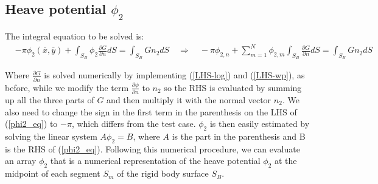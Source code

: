 \documentclass[a4paper,10pt]{article}
\newcommand{\dd}{\partial}
\newcommand{\xbar}{\overline{x}}
\newcommand{\ybar}{\overline{y}}
\begin{document}
\subsection{Heave potential $\phi_2$}
The integral equation to be solved is:
\begin{align} \label{phi2_eq}
& -\pi \phi_2(\xbar, \ybar) + \int_{S_B} \phi_2 \frac{\dd G}{\dd n} dS = \int_{S_B} G n_2 dS
\quad \Rightarrow \quad -\pi \phi_{2,n} + \sum_{m=1}^N \phi_{2,m}\int_{S_B} \frac{\dd G}{\dd n} dS = \int_{S_B} G n_2 dS
\end{align} 

Where $\frac{\dd G}{\dd n}$ is solved numerically by implementing (\ref{LHS-log}) and (\ref{LHS-wp}), as before, while we modify the term $\frac{\dd \phi}{\dd n}$ to $n_2$ so the RHS is evaluated by summing up all the three parts of $G$ and then multiply it with the normal vector $n_2$. We also need to change the sign in the first term in the parenthesis on the LHS of (\ref{phi2_eq}) to $-\pi$, which differs from the test case. $\phi_2$ is then easily estimated by solving the linear system $A \phi_2 = B$, where $A$ is the part in the parenthesis and B is the RHS of (\ref{phi2_eq}). Following this numerical procedure, we can evaluate an array $\phi_2$ that is a numerical representation of the heave potential $\phi_2$ at the midpoint of each segment $S_m$ of the rigid body surface $S_B$.
\end{document}
